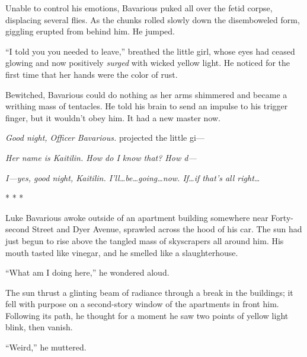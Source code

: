 Unable to control his emotions, Bavarious puked all over the fetid
corpse, displacing several flies. As the chunks rolled slowly down
the disemboweled form, giggling erupted from behind him. He
jumped.



``I told you you needed to leave,'' breathed the little girl, whose
eyes had ceased glowing and now positively {\em surged} with
wicked yellow light. He noticed for the first time that her hands
were the color of rust.



Bewitched, Bavarious could do nothing as her arms shimmered and
became a writhing mass of tentacles. He told his brain to send an
impulse to his trigger finger, but it wouldn't obey him. It had a
new master now.



{\em Good night, Officer Bavarious.} projected the little
gi---



{\em Her name is Kaitilin. How do I know that? How d---}



{\em I---yes, good night, Kaitilin. I'll{\ldots}be{\ldots}going{\ldots}now.
If{\ldots}if that's all right{\ldots}}



* * *



Luke Bavarious awoke outside of an apartment building somewhere
near Forty-second Street and Dyer Avenue, sprawled across the hood
of his car. The sun had just begun to rise above the tangled mass
of skyscrapers all around him. His mouth tasted like vinegar, and
he smelled like a slaughterhouse.



``What am I doing here,'' he wondered aloud.



The sun thrust a glinting beam of radiance through a break in the
buildings; it fell with purpose on a second-story window of the
apartments in front him. Following its path, he thought for a
moment he saw two points of yellow light blink, then vanish.



``Weird,'' he muttered. 
 



